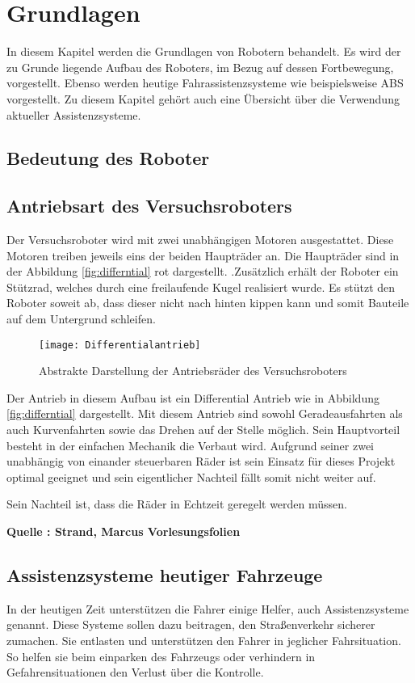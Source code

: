 \chapter{Grundlagen}
In diesem Kapitel werden die Grundlagen von Robotern behandelt. Es wird der zu Grunde liegende Aufbau des Roboters, im Bezug auf dessen Fortbewegung, vorgestellt. Ebenso werden heutige Fahrassistenzsysteme wie beispielsweise ABS vorgestellt. Zu diesem Kapitel gehört auch eine Übersicht über die Verwendung aktueller Assistenzsysteme.
\section{Bedeutung des Roboter}

\section{Antriebsart des Versuchsroboters} \label{lab:Antriebsart}
Der Versuchsroboter wird mit zwei unabhängigen Motoren ausgestattet. Diese Motoren treiben jeweils eins der beiden Haupträder an. Die Haupträder sind in der Abbildung \vref{fig:differntial} rot dargestellt. .Zusätzlich erhält der Roboter ein Stützrad, welches durch eine freilaufende Kugel realisiert wurde. Es stützt den Roboter soweit ab, dass dieser nicht nach hinten kippen kann und somit Bauteile auf dem Untergrund schleifen.
\begin{figure}[htb]
\centering
\texttt{[image: Differentialantrieb]}
\caption{Abstrakte Darstellung der Antriebsräder des Versuchsroboters}
\label{fig:differntial}
\end{figure}

Der Antrieb in diesem Aufbau ist ein Differential Antrieb wie in Abbildung \vref{fig:differntial} dargestellt. Mit diesem Antrieb sind sowohl Geradeausfahrten als auch Kurvenfahrten sowie das Drehen auf der Stelle möglich. Sein Hauptvorteil besteht in der einfachen Mechanik die Verbaut wird. Aufgrund seiner zwei unabhängig von einander steuerbaren Räder ist sein Einsatz für dieses Projekt optimal geeignet und sein eigentlicher Nachteil fällt somit nicht weiter auf.
 
Sein Nachteil ist, dass die Räder in Echtzeit geregelt werden müssen.  

\textbf{Quelle : Strand, Marcus Vorlesungsfolien } 

\section{Assistenzsysteme heutiger Fahrzeuge}
In der heutigen Zeit unterstützen die Fahrer einige Helfer, auch Assistenzsysteme genannt. Diese Systeme sollen dazu beitragen, den Straßenverkehr sicherer zumachen. Sie entlasten und unterstützen den Fahrer in jeglicher Fahrsituation. So helfen sie beim einparken des Fahrzeugs oder verhindern in Gefahrensituationen den Verlust über die Kontrolle.

